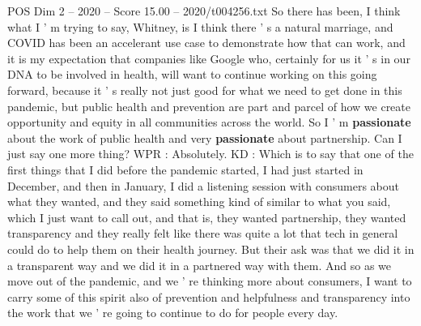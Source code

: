 \begin{textsample}{POS Dim 2 – 2020 – Score 15.00 – 2020/t004256.txt}
So there has been, I think what I ' m trying to say, Whitney, is I think there ' s a natural marriage, and COVID has been an accelerant use case to demonstrate how that can work, and it is my expectation that companies like Google who, certainly for us it ' s in our DNA to be involved in health, will want to continue working on this going forward, because it ' s really not just good for what we need to get done in this pandemic, but public health and prevention are part and parcel of how we create opportunity and equity in all communities across the world.
So I ' m \textbf{passionate} about the work of public health and very \textbf{passionate} about partnership.
Can I just say one more thing?
WPR : Absolutely.
KD : Which is to say that one of the first things that I did before the pandemic started, I had just started in December, and then in January, I did a listening session with consumers about what they wanted, and they said something kind of similar to what you said, which I just want to call out, and that is, they wanted partnership, they wanted transparency and they really felt like there was quite a lot that tech in general could do to help them on their health journey.
But their ask was that we did it in a transparent way and we did it in a partnered way with them.
And so as we move out of the pandemic, and we ' re thinking more about consumers, I want to carry some of this spirit also of prevention and helpfulness and transparency into the work that we ' re going to continue to do for people every day.

\end{textsample}
